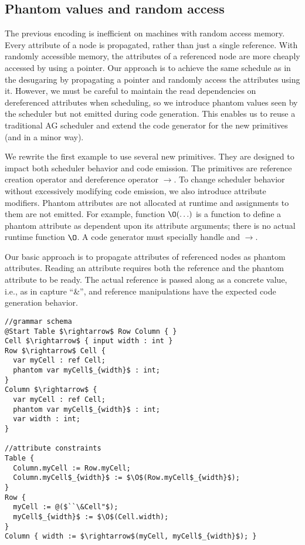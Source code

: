 \subsection{Phantom values and random access}
The previous encoding is inefficient on machines with random access memory. Every attribute of a node is propagated, rather than just a single reference. With randomly accessible memory, the attributes of a referenced node are more cheaply accessed by using a pointer. Our approach is to achieve the same schedule as in the desugaring by propagating a pointer and randomly access the attributes using it. However, we must be careful to maintain the read dependencies on dereferenced attributes when scheduling, so we introduce phantom values seen by the scheduler but not emitted during code generation. This enables us to reuse a traditional AG scheduler and extend the code generator for  the new primitives (and in a minor way).

We rewrite the first example to use several new primitives. They are designed to impact both scheduler behavior and code emission. The primitives are reference creation operator  and dereference operator $\rightarrow$. To change scheduler behavior without excessively modifying code emission, we also introduce  attribute modifiers. Phantom attributes are not allocated at runtime and assignments to them are not emitted. For example, function $\O(\ldots)$ is a function to define a phantom attribute as dependent upon its attribute arguments; there is no actual runtime function $\O$. A code generator must specially handle  and $\rightarrow$.

Our basic approach is to propagate attributes of referenced nodes as phantom attributes. Reading an attribute requires both the reference and the phantom attribute to be ready. The actual reference is passed along as a concrete value, i.e., as in capture ``\&''\code{)}, and reference manipulations have the expected code generation behavior.

\begin{lstlisting}[mathescape]
//grammar schema
@Start Table $\rightarrow$ Row Column { }
Cell $\rightarrow$ { input width : int }
Row $\rightarrow$ Cell { 
  var myCell : ref Cell;
  phantom var myCell$_{width}$ : int; 
}
Column $\rightarrow$ { 
  var myCell : ref Cell; 
  phantom var myCell$_{width}$ : int; 
  var width : int;
}

//attribute constraints
Table { 
  Column.myCell := Row.myCell;
  Column.myCell$_{width}$ := $\O$(Row.myCell$_{width}$); 
}
Row { 
  myCell := @($``\&Cell"$);
  myCell$_{width}$ := $\O$(Cell.width); 
}
Column { width := $\rightarrow$(myCell, myCell$_{width}$); }
\end{lstlisting}

